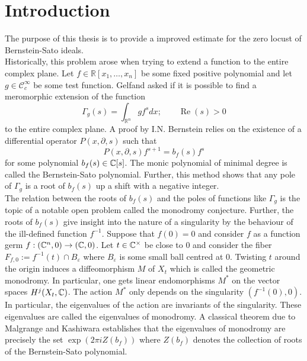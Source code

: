 \chapter*{Introduction}\label{ch: Introduction} %



The purpose of this thesis is to provide a improved estimate for the zero locust of Bernstein-Sato ideals.\\

Historically, this problem arose when trying to extend a function to the entire complex plane.
Let $f\in \mathbb{R}[x_1,\ldots,x_n]$ be some fixed positive polynomial and let $g \in \mathcal{C}_c^\infty$ be some test function.
Gelfand asked if it is possible to find a meromorphic extension of the function
$$\Gamma_g(s) = \int_{\mathbb{R}^n} g f^s dx; \qquad \operatorname{Re}(s)>0 $$
to the entire complex plane.
A proof by I.N. Bernstein relies on the existence of a differential operator $P(x,\partial, s)$ such that
$$P(x,\partial,s) f^{s+1} = b_f(s) f^s$$
for some polynomial $b_f(s)\in \mathbb{C}[s]$.
The monic polynomial of minimal degree is called the Bernstein-Sato polynomial.
Further, this method shows that any pole of $\Gamma_g$ is a root of $b_f(s)$ up a shift with a negative integer.\\

The relation between the roots of $b_f(s)$ and the poles of functions like $\Gamma_g$ is the topic of a notable open problem called the monodromy conjecture.
Further, the roots of $b_f(s)$ give insight into the nature of a singularity by the behaviour of the ill-defined function $f^{-1}$.
Suppose that $f(0)= 0$ and consider $f$ as a function germ $f:(\mathbb{C}^n,0)\to (\mathbb{C},0)$.
Let $t\in \mathbb{C}^\times$ be close to $0$ and consider the fiber $F_{f,0} := f^{-1}(t)\cap B_\varepsilon$ where $B_\varepsilon$ is some small ball centred at $0$.
Twisting $t$ around the origin induces a diffeomorphism $M$ of $X_t$ which is called the geometric monodromy.
In particular, one gets linear endomorphisms $M^*$ on the vector spaces $H^j(X_t,\mathbb{C})$.
The action $M^*$ only depends on the singularity $(f^{-1}(0),0)$.
In particular, the eigenvalues of the action are invariants of the singularity.
These eigenvalues are called the eigenvalues of monodromy.
A classical theorem due to Malgrange and Kashiwara establishes that the eigenvalues of monodromy are precisely the set $\exp(2\pi i Z(b_f))$ where $Z(b_f)$ denotes the collection of roots of the Bernstein-Sato polynomial.

